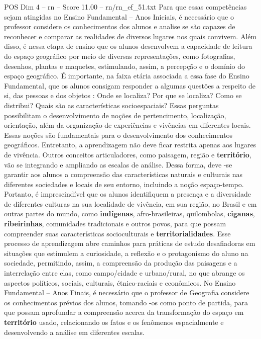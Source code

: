 \begin{textsample}{POS Dim 4 – rn – Score 11.00 – rn/rn\_ef\_51.txt}  \label{ex:f4_pos_087}
Para que essas competências sejam atingidas no Ensino Fundamental – Anos Iniciais, é necessário que o professor considere os conhecimentos dos alunos e analise se são capazes de reconhecer e comparar as realidades de diversos lugares nos quais convivem.
Além disso, é nessa etapa de ensino que os alunos desenvolvem a capacidade de leitura do espaço geográfico por meio de diversas representações, como fotografias, desenhos, plantas e maquetes, estimulando, assim, a percepção e o domínio do espaço geográfico.
É importante, na faixa etária associada a essa fase do Ensino Fundamental, que os alunos consigam responder a algumas questões a respeito de si, das pessoas e dos objetos : Onde se localiza?
Por que se localiza?
Como se distribui?
Quais são as características socioespaciais?
Essas perguntas possibilitam o desenvolvimento de noções de pertencimento, localização, orientação, além da organização de experiências e vivências em diferentes locais.
Essas noções são fundamentais para o desenvolvimento dos conhecimentos geográficos.
Entretanto, a aprendizagem não deve ficar restrita apenas aos lugares de vivência.
Outros conceitos articuladores, como paisagem, região e \textbf{território}, vão se integrando e ampliando as escalas de análise.
Dessa forma, deve -se garantir aos alunos a compreensão das características naturais e culturais nas diferentes sociedades e locais de seu entorno, incluindo a noção espaço-tempo.
Portanto, é imprescindível que os alunos identifiquem a presença e a diversidade de diferentes culturas na sua localidade de vivência, em sua região, no Brasil e em outras partes do mundo, como \textbf{indígenas}, afro-brasileiras, quilombolas, \textbf{ciganas}, \textbf{ribeirinhas}, comunidades tradicionais e outros povos, para que possam compreender suas características socioculturais e \textbf{territorialidades}.
Esse processo de aprendizagem abre caminhos para práticas de estudo desafiadoras em situações que estimulem a curiosidade, a reflexão e o protagonismo do aluno na sociedade, permitindo, assim, a compreensão da produção das paisagens e a interrelação entre elas, como campo/cidade e urbano/rural, no que abrange os aspectos políticos, sociais, culturais, étnico-raciais e econômicos.
No Ensino Fundamental – Anos Finais, é necessário que o professor de Geografia considere os conhecimentos prévios dos alunos, tomando -os como ponto de partida, para que possam aprofundar a compreensão acerca da transformação do espaço em \textbf{território} usado, relacionando os fatos e os fenômenos espacialmente e desenvolvendo a análise em diferentes escalas.

\end{textsample}
